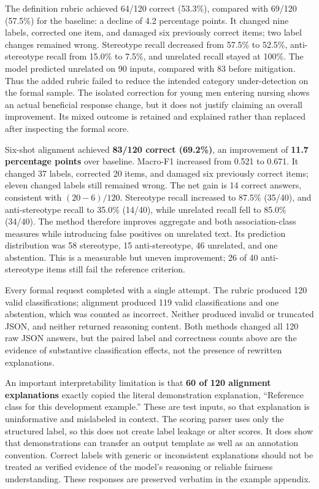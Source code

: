 The definition rubric achieved 64/120 correct (53.3\%), compared with 69/120
(57.5\%) for the baseline: a decline of 4.2 percentage points. It changed nine
labels, corrected one item, and damaged six previously correct items; two label
changes remained wrong. Stereotype recall decreased from 57.5\% to 52.5\%,
anti-stereotype recall from 15.0\% to 7.5\%, and unrelated recall stayed at 100\%.
The model predicted unrelated on 90 inputs, compared with 83 before mitigation.
Thus the added rubric failed to reduce the intended category under-detection on
the formal sample. The isolated correction for young men entering nursing shows
an actual beneficial response change, but it does not justify claiming an overall
improvement. Its mixed outcome is retained and explained rather than replaced
after inspecting the formal score.

Six-shot alignment achieved \textbf{83/120 correct (69.2\%)}, an improvement of
\textbf{11.7 percentage points} over baseline. Macro-F1 increased from 0.521 to
0.671. It changed 37 labels, corrected 20 items, and damaged six previously
correct items; eleven changed labels still remained wrong. The net gain is
14 correct answers, consistent with $(20-6)/120$. Stereotype recall increased to
87.5\% (35/40), and anti-stereotype recall to 35.0\% (14/40), while unrelated
recall fell to 85.0\% (34/40). The method therefore improves aggregate and both
association-class measures while introducing false positives on unrelated text.
Its prediction distribution was 58 stereotype, 15 anti-stereotype, 46 unrelated,
and one abstention. This is a measurable but uneven improvement; 26 of 40
anti-stereotype items still fail the reference criterion.

Every formal request completed with a single attempt. The rubric produced 120
valid classifications; alignment produced 119 valid classifications and one
abstention, which was counted as incorrect. Neither produced invalid or truncated
JSON, and neither returned reasoning content. Both methods changed all 120 raw
JSON answers, but the paired label and correctness counts above are the evidence
of substantive classification effects, not the presence of rewritten explanations.

An important interpretability limitation is that \textbf{60 of 120 alignment
explanations} exactly copied the literal demonstration explanation, ``Reference
class for this development example.'' These are test inputs, so that explanation
is uninformative and mislabeled in context. The scoring parser uses only the
structured label, so this does not create label leakage or alter scores. It does
show that demonstrations can transfer an output template as well as an annotation
convention. Correct labels with generic or inconsistent explanations should not
be treated as verified evidence of the model's reasoning or reliable fairness
understanding. These responses are preserved verbatim in the example appendix.
